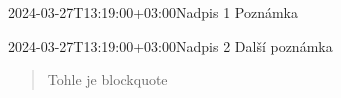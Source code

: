 \documentclass{article}
\begin{document}
\begin{note}{2024-03-27T13:19:00+03:00}{Nadpis 1}
  Poznámka
\end{note}

\begin{note}{2024-03-27T13:19:00+03:00}{Nadpis 2}
  Další poznámka
  \begin{quote}
    Tohle je blockquote
  \end{quote}
\end{note}

\end{document}
